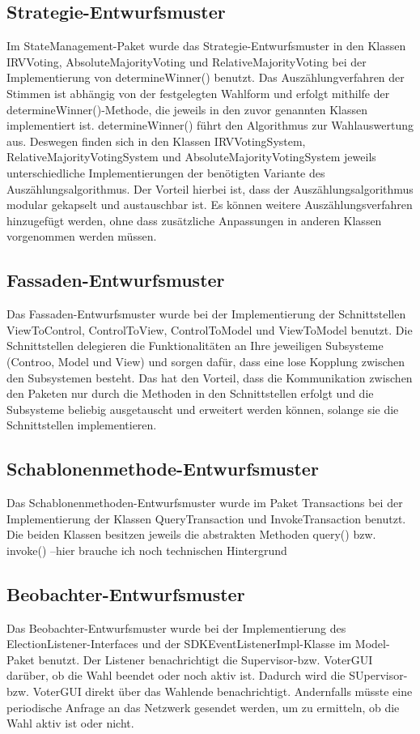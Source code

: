 \documentclass[parskip=full]{scrartcl}
\begin{document}
\subsection{Strategie-Entwurfsmuster}
Im StateManagement-Paket wurde das Strategie-Entwurfsmuster in den Klassen IRVVoting, AbsoluteMajorityVoting und RelativeMajorityVoting bei der Implementierung von determineWinner() benutzt.
Das Auszählungverfahren der Stimmen ist abhängig von der festgelegten Wahlform und erfolgt mithilfe der determineWinner()-Methode, die jeweils in den zuvor genannten Klassen implementiert ist.
determineWinner() führt den Algorithmus zur Wahlauswertung aus. Deswegen finden sich in den Klassen IRVVotingSystem, RelativeMajorityVotingSystem und AbsoluteMajorityVotingSystem jeweils unterschiedliche Implementierungen der benötigten Variante des Auszählungsalgorithmus.
Der Vorteil hierbei ist, dass der Auszählungsalgorithmus modular gekapselt und austauschbar ist. Es können weitere Auszählungsverfahren hinzugefügt werden, ohne dass zusätzliche Anpassungen in anderen Klassen vorgenommen werden müssen.

\subsection{Fassaden-Entwurfsmuster}

Das Fassaden-Entwurfsmuster wurde bei der Implementierung der Schnittstellen ViewToControl, ControlToView, ControlToModel und ViewToModel benutzt. Die Schnittstellen delegieren die Funktionalitäten an Ihre jeweiligen Subsysteme (Controo, Model und View) und sorgen dafür, dass eine lose Kopplung zwischen den Subsystemen besteht.
Das hat den Vorteil, dass die Kommunikation zwischen den Paketen nur durch die Methoden in den Schnittstellen erfolgt und die Subsysteme beliebig ausgetauscht und erweitert werden können, solange sie die Schnittstellen implementieren.

\subsection{Schablonenmethode-Entwurfsmuster}
Das Schablonenmethoden-Entwurfsmuster wurde im Paket Transactions bei der Implementierung der Klassen QueryTransaction und InvokeTransaction benutzt.
Die beiden Klassen besitzen jeweils die abstrakten Methoden query() bzw. invoke() --hier brauche ich noch technischen Hintergrund

\subsection{Beobachter-Entwurfsmuster}
Das Beobachter-Entwurfsmuster wurde bei der Implementierung des ElectionListener-Interfaces und der SDKEventListenerImpl-Klasse im Model-Paket benutzt. Der Listener benachrichtigt die Supervisor-bzw. VoterGUI darüber, ob die Wahl beendet oder noch aktiv ist. Dadurch wird die SUpervisor- bzw. VoterGUI direkt über das Wahlende benachrichtigt. Andernfalls müsste eine periodische Anfrage an das Netzwerk gesendet werden, um zu ermitteln, ob die Wahl aktiv ist oder nicht. 
\end{document}
